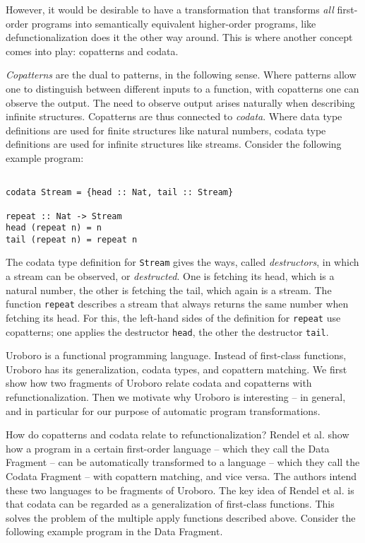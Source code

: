 However, it would be desirable to have a transformation that transforms \textit{all} first-order programs into semantically equivalent higher-order programs, like defunctionalization does it the other way around. This is where another concept comes into play: copatterns and codata.

\textit{Copatterns} are the dual to patterns, in the following sense. Where patterns allow one to distinguish between different inputs to a function, with copatterns one can observe the output. The need to observe output arises naturally when describing infinite structures. Copatterns are thus connected to \textit{codata}. Where data type definitions are used for finite structures like natural numbers, codata type definitions are used for infinite structures like streams. Consider the following example program:

\begin{lstlisting}

codata Stream = {head :: Nat, tail :: Stream}

repeat :: Nat -> Stream
head (repeat n) = n
tail (repeat n) = repeat n

\end{lstlisting}

The codata type definition for \texttt{Stream} gives the ways, called \textit{destructors}, in which a stream can be observed, or \textit{destructed}. One is fetching its head, which is a natural number, the other is fetching the tail, which again is a stream. The function \texttt{repeat} describes a stream that always returns the same number when fetching its head. For this, the left-hand sides of the definition for \texttt{repeat} use copatterns; one applies the destructor \texttt{head}, the other the destructor \texttt{tail}.

Uroboro is a functional programming language. Instead of first-class functions, Uroboro has its generalization, codata types, and copattern matching. We first show how two fragments of Uroboro relate codata and copatterns with refunctionalization. Then we motivate why Uroboro is interesting -- in general, and in particular for our purpose of automatic program transformations.

How do copatterns and codata relate to refunctionalization? Rendel et al.\cite{rendel15automatic} show how a program in a certain first-order language -- which they call the Data Fragment -- can be automatically transformed to a language -- which they call the Codata Fragment -- with copattern matching, and vice versa. The authors intend these two languages to be fragments of Uroboro. The key idea of Rendel et al. is that codata can be regarded as a generalization of first-class functions. This solves the problem of the multiple apply functions described above. Consider the following example program in the Data Fragment.

